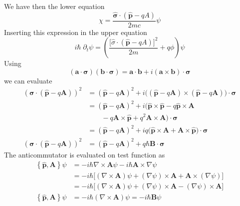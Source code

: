 \documentclass[../../../main.tex]{subfiles}
\begin{document}
We have then the lower equation
\begin{equation*}
    \chi = \frac{\hat{\boldsymbol{\sigma}}\cdot(\hat{\mathbf{p}}-qA)}{2mc}\psi
\end{equation*}
Inserting this expression in the upper equation
\begin{equation*}
    i\hbar \; \partial_t\psi
    = \left(\frac{\big[\hat{\sigma}\cdot(\hat{\mathbf{p}}-qA)\big]^2}{2m}+q\phi\right)\psi
\end{equation*}
Using
\begin{equation*}
    (\mathbf{a} \cdot \boldsymbol{\sigma})(\mathbf{b} \cdot \boldsymbol{\sigma}) = \mathbf{a} \cdot \mathbf{b} + i(\mathbf{a} \times \mathbf{b}) \cdot \boldsymbol{\sigma}
\end{equation*}
we can evaluate
\begin{align*}
    (\boldsymbol{\sigma}\cdot(\mathbf{{\hat{p}}}-q\mathbf{A}))^2
     & = (\mathbf{{\hat{p}}}-q\mathbf{A}) ^{2}+ i\big((\mathbf{{\hat{p}}}-q\mathbf{A})\times(\mathbf{{\hat{p}}}-q\mathbf{A})\big)\cdot\boldsymbol{\sigma}    \\
     & = (\mathbf{{\hat{p}}}-q\mathbf{A}) ^{2}+ i\big(    \mathbf{{\hat{p}}}\times\mathbf{{\hat{p}}} - q\mathbf{{\hat{p}}}\times\mathbf{A}                   \\
     & \qquad- q\mathbf{A}\times\mathbf{{\hat{p}}} + q^{2}\mathbf{A}\times\mathbf{A}\big)\cdot\boldsymbol{\sigma}                                            \\
     & = (\mathbf{{\hat{p}}}-q\mathbf{A}) ^{2}+ iq\big(\mathbf{{\hat{p}}}\times\mathbf{A} + \mathbf{A}\times\mathbf{{\hat{p}}} \big)\cdot\boldsymbol{\sigma} \\
    (\boldsymbol{\sigma}\cdot(\mathbf{{\hat{p}}}-q\mathbf{A}))^2
     & = (\mathbf{{\hat{p}}}-q\mathbf{A}) ^{2}+ q \hbar \mathbf{B}\cdot\boldsymbol{\sigma}
\end{align*}
The anticommutator is evaluated on test function as
\begin{align*}
    \left\{ \mathbf{\hat{p },\mathbf{A }} \right\} \psi
     & =-i\hbar\nabla\times\mathbf{A}\psi - i \hbar\mathbf{A}\times\nabla\psi                                                  \\
     & = -i\hbar\big[(\nabla\times\mathbf{A}) \psi + (\nabla \psi) \times  \mathbf{A}+\mathbf{A}\times(\nabla\psi)\big]        \\
     & = -i\hbar\big[(\nabla\times\mathbf{A}) \psi + (\nabla \psi) \times  \mathbf{A} - (\nabla \psi) \times  \mathbf{A} \big] \\
    \left\{ \mathbf{\hat{p },\mathbf{A }} \right\} \psi
     & = -i\hbar(\nabla\times\mathbf{A}) \psi = -i\hbar \mathbf{B} \psi
\end{align*}
\end{document}

